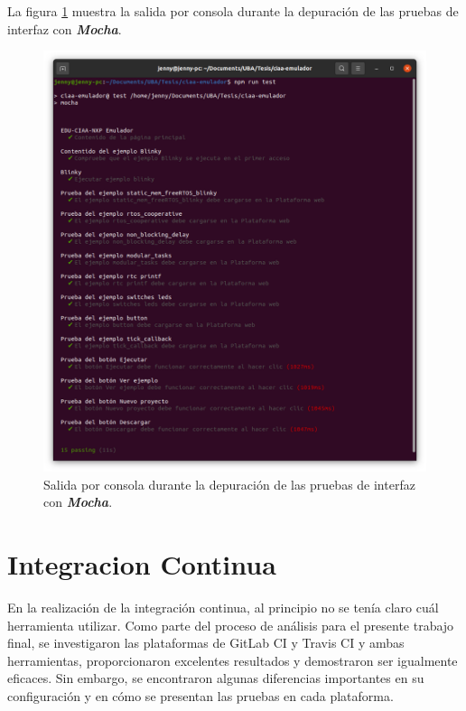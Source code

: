 La figura \ref{fig:TestVS1} muestra la salida por consola durante la depuración de las pruebas de interfaz con \textit{\textbf{Mocha}}.


\begin{figure}[ht]
	\centering
	\includegraphics[scale=.29]{./Figures/TestInterfaz.png}
	\caption{Salida por consola durante la depuración de las pruebas de interfaz con \textit{\textbf{Mocha}}.}
	\label{fig:TestVS1}
\end{figure}

\section{Integracion Continua}
\label{sec:Integracion Continua}

En la realización de la integración continua, al principio no se tenía claro cuál herramienta utilizar. Como parte del proceso de análisis para el presente trabajo final, se investigaron las plataformas de GitLab CI y Travis CI y ambas herramientas, proporcionaron excelentes resultados y demostraron ser igualmente eficaces. Sin embargo, se encontraron algunas diferencias importantes en su configuración y en cómo se presentan las pruebas en cada plataforma.


